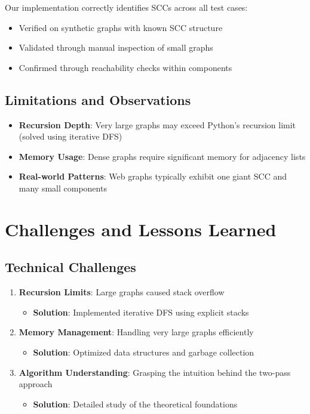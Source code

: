 \documentclass[12pt]{article}
\begin{document}
Our implementation correctly identifies SCCs across all test cases:
\begin{itemize}
    \item Verified on synthetic graphs with known SCC structure
    \item Validated through manual inspection of small graphs
    \item Confirmed through reachability checks within components
\end{itemize}

\subsection{Limitations and Observations}

\begin{itemize}
    \item \textbf{Recursion Depth}: Very large graphs may exceed Python's recursion limit (solved using iterative DFS)
    \item \textbf{Memory Usage}: Dense graphs require significant memory for adjacency lists
    \item \textbf{Real-world Patterns}: Web graphs typically exhibit one giant SCC and many small components
\end{itemize}

\section{Challenges and Lessons Learned}
\subsection{Technical Challenges}

\begin{enumerate}
    \item \textbf{Recursion Limits}: Large graphs caused stack overflow
    \begin{itemize}
        \item \textbf{Solution}: Implemented iterative DFS using explicit stacks
    \end{itemize}
    
    \item \textbf{Memory Management}: Handling very large graphs efficiently
    \begin{itemize}
        \item \textbf{Solution}: Optimized data structures and garbage collection
    \end{itemize}
    
    \item \textbf{Algorithm Understanding}: Grasping the intuition behind the two-pass approach
    \begin{itemize}
        \item \textbf{Solution}: Detailed study of the theoretical foundations
    \end{itemize}
\end{enumerate}
\end{document}
